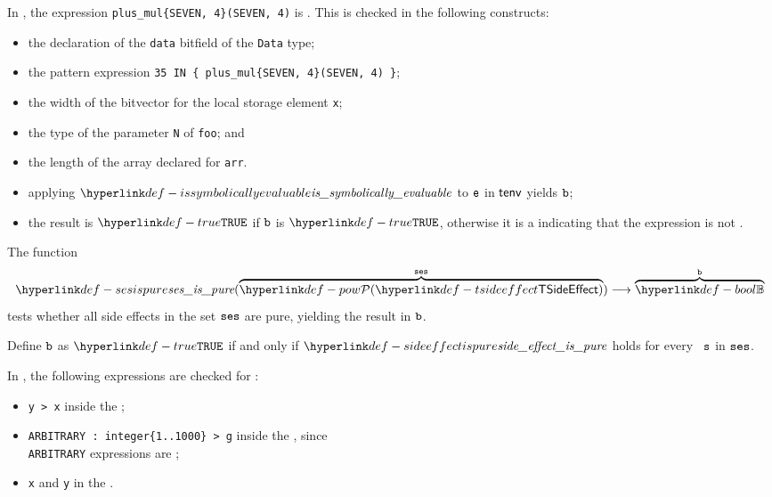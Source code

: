 In ,
the expression \verb|plus_mul{SEVEN, 4}(SEVEN, 4)| is \symbolicallyevaluable.
This is checked in the following constructs:
\begin{itemize}
    \item the declaration of the \verb|data| bitfield of the \verb|Data| type;
    \item the pattern expression \verb|35 IN { plus_mul{SEVEN, 4}(SEVEN, 4) }|;
    \item the width of the bitvector for the local storage element \verb|x|;
    \item the type of the parameter \verb|N| of \verb|foo|; and
    \item the length of the array declared for \verb|arr|.
\end{itemize}

\ProseParagraph
\AllApply
\begin{itemize}
  \item applying $\issymbolicallyevaluable$ to $\ve$ in $\tenv$ yields $\vb$;
  \item the result is $\True$ if $\vb$ is $\True$, otherwise it is a \typingerrorterm{} indicating that the expression
  is not \symbolicallyevaluable.
\end{itemize}

\FormallyParagraph
\begin{mathpar}
\end{mathpar}

\hypertarget{def-sesispure}{}
The function
\[
    \sesispure(\overname{\TSideEffectSet}{\vses}) \aslto \overname{\Bool}{\vb}
\]
tests whether all side effects in the set $\vses$ are pure, yielding the result in $\vb$.

\ProseParagraph
Define $\vb$ as $\True$ if and only if $\sideeffectispure$ holds for
every \sideeffectdescriptorterm\ $\vs$ in $\vses$.

In , the following expressions are checked for \purity:
\begin{itemize}
    \item \verb|y > x| inside the \assertionstatementterm;
    \item \verb|ARBITRARY : integer{1..1000} > g| inside the \assertionstatementterm,
          since \\
          \verb|ARBITRARY| expressions are \pure;
    \item \verb|x| and \verb|y| in the \forstatementterm.
\end{itemize}

